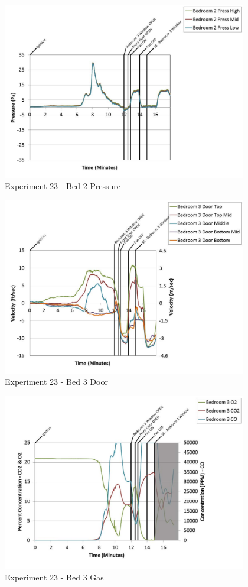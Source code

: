 \documentclass{article}
\begin{document}
\begin{appendices}
	\clearpage

	\begin{figure}[h!]
		\centering
		\includegraphics[height=3.05in]{0_Images/Results_Charts/Exp_23_Charts/Bed2Pressure.pdf}
		\caption{Experiment 23 - Bed 2 Pressure}
	\end{figure}
 

	\begin{figure}[h!]
		\centering
		\includegraphics[height=3.05in]{0_Images/Results_Charts/Exp_23_Charts/Bed3Door.pdf}
		\caption{Experiment 23 - Bed 3 Door}
	\end{figure}
 
	\clearpage

	\begin{figure}[h!]
		\centering
		\includegraphics[height=3.05in]{0_Images/Results_Charts/Exp_23_Charts/Bed3Gas.pdf}
		\caption{Experiment 23 - Bed 3 Gas}
	\end{figure}
 


\end{appendices}
\end{document}
